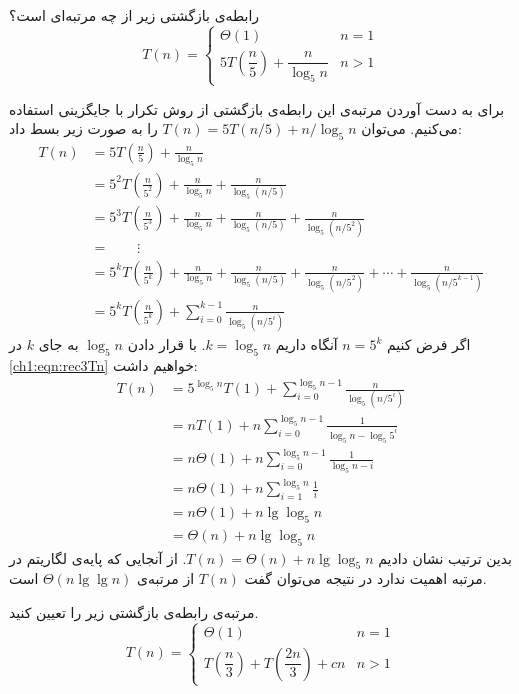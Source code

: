 {{ رابطه‌ی بازگشتی زیر از چه مرتبه‌ای است؟
\begin{displaymath}
T(n)=
\begin{cases}
\Theta (1) & n=1\\[0.3cm]
5T\left(\dfrac{n}{5}\right)+\dfrac{n}{\log_5{n}} & n>1
\end{cases}
\end{displaymath}


برای به دست آوردن مرتبه‌ی این رابطه‌ی بازگشتی از روش تکرار با جایگزینی استفاده می‌کنیم. می‌توان {$T(n)=5T(n/5)+n/\log_5 n$} را به صورت زیر بسط داد:
\begin{align}
T(n) &=5T\left( \frac{n}{5}\right)+\frac{n}{\log_5{n}}\nonumber\\[0.3cm]
		&=5^2T\left( \frac{n}{5^2}\right)+\frac{n}{\log_5{n}}+\frac{n}{\log_5(n/5)}\nonumber\\[0.3cm]
		&=5^3T\left( \frac{n}{5^3}\right)+\frac{n}{\log_5{n}}+\frac{n}{\log_5(n/5)}+\frac{n}{\log_5{(n/5^2)}} \nonumber\\
		&=\qquad \vdots\nonumber\\
		&= 5^kT\left( \frac{n}{5^k}\right)+\frac{n}{\log_5{n}}+\frac{n}{\log_5{(n/5)}}+\frac{n}{\log_5{(n/5^2)}}+ \cdots +\frac{n}{\log_5{(n/5^{k-1})}}\nonumber\\[0.3cm]
		&= 5^kT\left( \frac{n}{5^k}\right) + \sum_{i=0}^{k-1}{\frac{n}{\log_5{(n/5^i)}}}\label{ch1:eqn:rec3Tn}
\end{align}
اگر فرض کنیم {$n=5^k$} آنگاه داریم {$k=\log_5{n}$}. با قرار دادن {$\log_5{n}$} به جای {$k$} در {\eqref{ch1:eqn:rec3Tn}} خواهیم داشت:
\begin{align*}
T(n) &= 5^{\log_5{n}}T(1)+\sum_{i=0}^{\log_5{n}-1}{\frac{n}{\log_5{(n/5^i)}}}\\
		&= nT(1)+n\sum_{i=0}^{\log_5{n}-1}{\frac{1}{\log_5 n - \log_5 5^i}}\\
		&= n\Theta (1)+n\sum_{i=0}^{\log_5{n}-1}{\frac{1}{\log_5{n}-i}}\\
		&= n\Theta (1)+n\sum_{i=1}^{\log_5{n}}{\frac{1}{i}}\\
		&= n\Theta (1)+n\lg {\log_5{n}}\\
		&= \Theta (n)+n\lg {\log_5{n}}
\end{align*}
بدین ترتیب نشان دادیم {$T(n)= \Theta (n)+n\lg {\log_5{n}}$}. از آنجایی که پایه‌ی لگاریتم در مرتبه‌ اهمیت ندارد در نتیجه می‌توان گفت {$T(n)$} از مرتبه‌ی {$\Theta(n\lg {\lg{n}})$} است.

 مرتبه‌ی رابطه‌ی بازگشتی زیر را تعیین کنید.
\begin{displaymath}
T(n)=
\begin{cases}
\Theta (1) & n=1\\[0.3cm]
T\left(\dfrac{n}{3}\right)+ T\left(\dfrac{2n}{3}\right) + cn & n>1
\end{cases}
\end{displaymath}

}}
